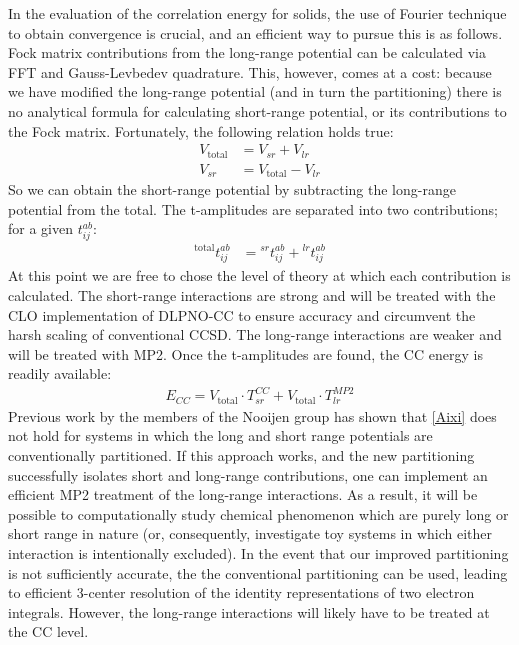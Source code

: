 \documentclass[letterpaper, 12pt]{article}
\begin{document}
In the evaluation of the correlation energy for solids, the use of Fourier technique to obtain convergence is crucial, and an efficient way to pursue this is as follows. Fock matrix contributions from the long-range potential can be calculated via FFT and Gauss-Levbedev quadrature. This, however, comes at a cost: because we have modified the long-range potential (and in turn the partitioning) there is no analytical formula for calculating short-range potential, or its contributions to the Fock matrix. Fortunately, the following relation holds true:
\begin{align}
V_{\text{total}} &= V_{sr} + V_{lr}\\
V_{sr} &= V_{\text{total}} - V_{lr}
\end{align}
So we can obtain the short-range potential by subtracting the long-range potential from the total.  The t-amplitudes are separated into two contributions; for a given $t^{ab}_{ij}$: 
\begin{align}
{}^{\text{total}}\!t^{ab}_{ij} &= {}^{sr}\!t^{ab}_{ij} + {}^{lr}\!t^{ab}_{ij}
\end{align}
At this point we are free to chose the level of theory at which each contribution is calculated. The short-range interactions are strong and will be treated with the CLO implementation of DLPNO-CC to ensure accuracy and circumvent the harsh scaling of conventional CCSD. The long-range interactions are weaker and will be treated with MP2. Once the t-amplitudes are found, the CC energy is readily available: 
\begin{align}
E_{CC}=V_{\text{total}} \cdot T^{CC}_{sr} + V_{\text{total}} \cdot T^{MP2}_{lr} \label{Aixi}
\end{align}
Previous work by the members of the Nooijen group has shown that \eqref{Aixi} does not hold for systems in which the long and short range potentials are conventionally partitioned. If this approach works, and the new partitioning successfully isolates short and long-range contributions, one can implement an efficient MP2 treatment of the long-range interactions.  As a result, it will be possible to computationally study chemical phenomenon which are purely long or short range in nature (or,  consequently, investigate toy systems in which either interaction is intentionally excluded). In the event that our improved partitioning is not sufficiently accurate, the the conventional partitioning can be used, leading to efficient 3-center resolution of the identity representations of two electron integrals. However, the long-range interactions will likely have to be treated at the CC level. 
\end{document}
